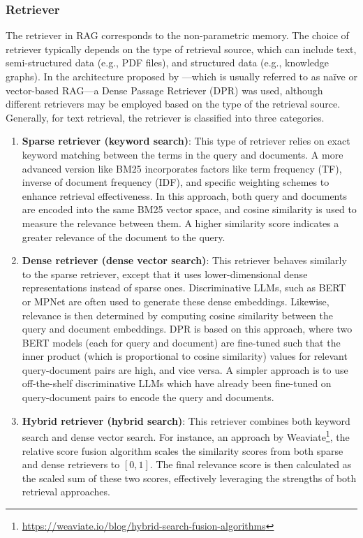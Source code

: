 \subsubsection{Retriever}
\label{chap2:rag-retriever}
The retriever in RAG corresponds to the non-parametric memory. The choice of retriever typically depends on the type of retrieval source, which can include text, semi-structured data (e.g., PDF files), and structured data (e.g., knowledge graphs). In the architecture proposed by \cite{lewis2021retrievalaugmentedgenerationknowledgeintensivenlp}---which is usually referred to as na\"{i}ve or vector-based RAG---a Dense Passage Retriever (DPR) was used, although different retrievers may be employed based on the type of the retrieval source. Generally, for text retrieval, the retriever is classified into three categories.
\begin{enumerate}
    \item \textbf{Sparse retriever (keyword search)}: This type of retriever relies on exact keyword matching between the terms in the query and documents. A more advanced version like BM25 \citep{robertsonbm25} incorporates factors like term frequency (TF), inverse of document frequency (IDF), and specific weighting schemes to enhance retrieval effectiveness. In this approach, both query and documents are encoded into the same BM25 vector space, and cosine similarity is used to measure the relevance between them. A higher similarity score indicates a greater relevance of the document to the query.
    \item \textbf{Dense retriever (dense vector search)}: This retriever behaves similarly to the sparse retriever, except that it uses lower-dimensional dense representations instead of sparse ones. Discriminative LLMs, such as BERT \citep{devlin2019bertpretrainingdeepbidirectional} or MPNet \citep{mpnetsong} are often used to generate these dense embeddings. Likewise, relevance is then determined by computing cosine similarity between the query and document embeddings. DPR \citep{karpukhin2020densepassageretrievalopendomain} is based on this approach, where two BERT models (each for query and document) are fine-tuned such that the inner product (which is proportional to cosine similarity) values for relevant query-document pairs are high, and vice versa. A simpler approach is to use off-the-shelf discriminative LLMs which have already been fine-tuned on query-document pairs to encode the query and documents.
    \item \textbf{Hybrid retriever (hybrid search)}: This retriever combines both keyword search and dense vector search. For instance, an approach by Weaviate\footnote{\url{https://weaviate.io/blog/hybrid-search-fusion-algorithms}}, the relative score fusion algorithm scales the similarity scores from both sparse and dense retrievers to $[0, 1]$. The final relevance score is then calculated as the scaled sum of these two scores, effectively leveraging the strengths of both retrieval approaches.
\end{enumerate}

